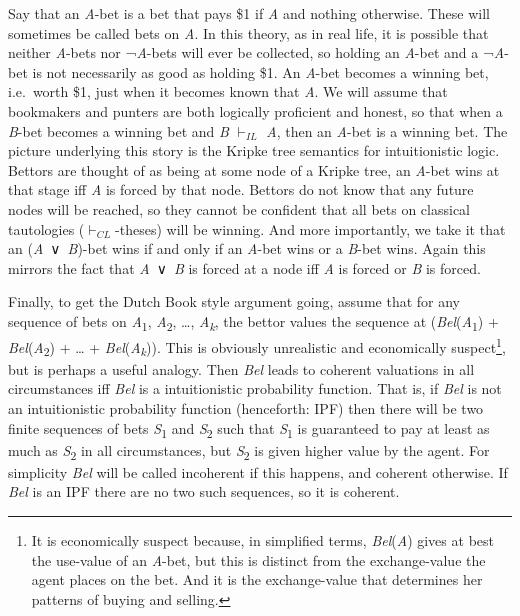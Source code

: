 \documentclass[
  10pt,
  letterpaper,
  DIV=11,
  numbers=noendperiod,
  twoside]{scrartcl}
\begin{document}
Say that an \emph{A}-bet is a bet that pays \$1 if \emph{A} and nothing
otherwise. These will sometimes be called bets on \emph{A}. In this
theory, as in real life, it is possible that neither \emph{A}-bets nor
¬\emph{A}-bets will ever be collected, so holding an \emph{A}-bet and a
¬\emph{A}-bet is not necessarily as good as holding \$1. An \emph{A}-bet
becomes a winning bet, i.e.~worth \$1, just when it becomes known that
\emph{A}. We will assume that bookmakers and punters are both logically
proficient and honest, so that when a \emph{B}-bet becomes a winning bet
and \emph{B} \(\vdash_{IL}\) \emph{A}, then an \emph{A}-bet is a winning
bet. The picture underlying this story is the Kripke tree semantics for
intuitionistic logic. Bettors are thought of as being at some node of a
Kripke tree, an \emph{A}-bet wins at that stage iff \emph{A} is forced
by that node. Bettors do not know that any future nodes will be reached,
so they cannot be confident that all bets on classical tautologies
(\(\vdash_{CL}\)-theses) will be winning. And more importantly, we take
it that an (\emph{A}~∨~\emph{B})-bet wins if and only if an \emph{A}-bet
wins or a \emph{B}-bet wins. Again this mirrors the fact that
\emph{A}~∨~\emph{B} is forced at a node iff \emph{A} is forced or
\emph{B} is forced.

Finally, to get the Dutch Book style argument going, assume that for any
sequence of bets on \emph{A}\textsubscript{1},
\emph{A}\textsubscript{2}, \ldots, \emph{A}\textsubscript{\emph{k}}, the
bettor values the sequence at (\emph{Bel}(\emph{A}\textsubscript{1}) +
\emph{Bel}(\emph{A}\textsubscript{2}) + \ldots{} +
\emph{Bel}(\emph{A}\textsubscript{\emph{k}})). This is obviously
unrealistic and economically suspect\footnote{It is economically suspect
  because, in simplified terms, \emph{Bel}(\emph{A}) gives at best the
  use-value of an \emph{A}-bet, but this is distinct from the
  exchange-value the agent places on the bet. And it is the
  exchange-value that determines her patterns of buying and selling.},
but is perhaps a useful analogy. Then \emph{Bel} leads to coherent
valuations in all circumstances iff \emph{Bel} is a intuitionistic
probability function. That is, if \emph{Bel} is not an intuitionistic
probability function (henceforth: IPF) then there will be two finite
sequences of bets \emph{S}\textsubscript{1} and
\emph{S}\textsubscript{2} such that \emph{S}\textsubscript{1} is
guaranteed to pay at least as much as \emph{S}\textsubscript{2} in all
circumstances, but \emph{S}\textsubscript{2} is given higher value by
the agent. For simplicity \emph{Bel} will be called incoherent if this
happens, and coherent otherwise. If \emph{Bel} is an IPF there are no
two such sequences, so it is coherent.
\end{document}
